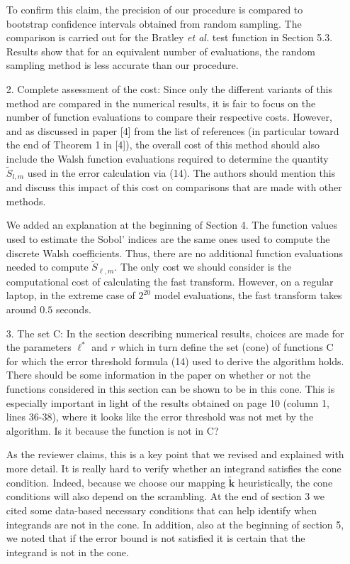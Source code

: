 \documentclass[10pt,a4paper]{article}
\newcommand{\vect}[1]{\boldsymbol{\mathbf{#1}}}
\newcommand{\vk}{\vect{k}}
\newcommand{\answer}[1]{{\color{blue} #1 }}
\begin{document}
\begin{itemize}
{To confirm this claim, the precision of our procedure is compared to bootstrap confidence intervals obtained from random sampling. The comparison is carried out for the Bratley \textit{et al.} test function in Section 5.3. Results show that for an equivalent number of evaluations, the random sampling method is less accurate than our procedure.}



\item[2.] Complete assessment of the cost: Since only the different variants of this method are compared in the numerical results, it is fair to focus on the number of function evaluations to compare their respective costs. However, and as discussed in paper [4] from the list of references (in particular toward the end of Theorem 1 in [4]), the overall cost of this method should also include the Walsh function evaluations required to determine the quantity $\widetilde{S}_{l,m}$ used in the error calculation via (14). The authors should mention this and discuss this impact of this cost on comparisons that are made with other methods.

\answer{We added an explanation at the beginning of Section 4. The function values used to estimate the Sobol' indices are the same ones used to compute the discrete Walsh coefficients. Thus, there are no additional function evaluations needed to compute $\widetilde{S}_{\ell,m}$. The only cost we should consider is the computational cost of calculating the fast transform. However, on a regular laptop, in the extreme case of $2^{20}$ model evaluations, the fast transform takes around $0.5$ seconds.}

\item[3.]The set C: In the section describing numerical results, choices are made for the parameters $\ell^*$ and $r$ which in turn define the set (cone) of functions C for which the error threshold formula (14) used to derive the algorithm holds. There should be some information in the paper on whether or not the functions considered in this section can be shown to be in this cone. This is especially important in light of the results obtained on page 10 (column 1, lines 36-38), where it looks like the error threshold was not met by the algorithm. Is it because the function is not in C?

\answer{As the reviewer claims, this is a key point that we revised and explained with more detail. It is really hard to verify whether an integrand satisfies the cone condition. Indeed, because we choose our mapping $\tilde{\vk}$ heuristically, the cone conditions will also depend on the scrambling. At the end of section 3 we cited some data-based necessary conditions that can help identify when integrands are not in the cone. In addition, also at the beginning of section 5, we noted that if the error bound is not satisfied it is certain that the integrand is not in the cone.}
\end{itemize}
\vspace*{0.5cm}
\end{document}
